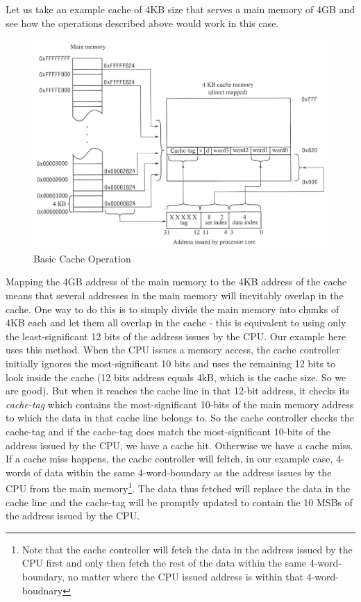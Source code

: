 Let us take an example cache of 4KB size that serves a main memory of 4GB and see how the operations described above would work in this case. 
	\begin{figure}[h]
		\centering
		\includegraphics[width = \textwidth]{partSys/directMappedCache}
		\caption{Basic Cache Operation}
		\label{fig:basicCacheOp}
	\end{figure}
Mapping the 4GB address of the main memory to the 4KB address of the cache means that several addresses in the main memory will inevitably overlap in the cache. One way to do this is to simply divide the main memory into chunks of 4KB each and let them all overlap in the cache - this is equivalent to using only the least-significant 12 bits of the address issues by the CPU. Our example here uses this method. When the CPU issues a memory access, the cache controller initially ignores the most-significant 10 bits and uses the remaining 12 bits to look inside the cache (12 bits address equals 4kB, which is the cache size. So we are good). But when it reaches the cache line in that 12-bit address, it checks its \emph{cache-tag} which contains the most-significant 10-bits of the main memory address to which the data in that cache line belongs to. So the cache controller checks the cache-tag and if the cache-tag does match the most-significant 10-bits of the address issued by the CPU, we have a cache hit. Otherwise we have a cache miss. If a cache miss happens, the cache controller will feltch, in our example case, 4-words of data within the same 4-word-boundary as the address issues by the CPU from the main memory\footnote{Note that the cache controller will fetch the data in the address issued by the CPU first and only then fetch the rest of the data within the same 4-word-boundary, no matter where the CPU issued address is within that 4-word-boudnary}. The data thus fetched will replace the data in the cache line and the cache-tag will be promptly updated to contain the 10 MSBs of the address issued by the CPU.

